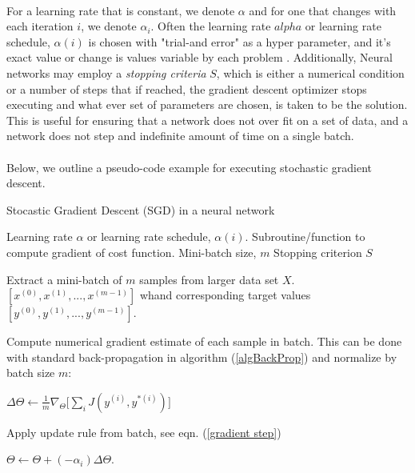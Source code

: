 \documentclass[12pt,letterpaper]{article}
\begin{document}
\paragraph*{}For a learning rate that is constant, we denote $\alpha$ and for one that changes with each iteration $i$, we denote $\alpha_i$. Often the learning rate $alpha$ or learning rate schedule, $\alpha(i)$ is chosen with "trial-and error" as a hyper parameter, and it's exact value or change is values variable by each problem \cite{Goodfellow}. Additionally, Neural networks may employ a \textit{stopping criteria} $S$, which is either a numerical condition or a number of steps that if reached, the gradient descent optimizer stops executing and what ever set of parameters are chosen, is taken to be the solution. This is useful for ensuring that a network does not over fit on a set of data, and a network does not step and indefinite amount of time on a single batch.

\paragraph*{}Below, we outline a pseudo-code example for executing stochastic gradient descent.

\begin{algorithm}
\caption{Stocastic Gradient Descent (SGD) in a neural network}
\label{algSGD}

\begin{algorithmic}

\REQUIRE Learning rate $\alpha$ or learning rate schedule, $\alpha(i)$.
\REQUIRE Subroutine/function to compute gradient of cost function.
\REQUIRE Mini-batch size, $m$
\REQUIRE Stopping criterion $S$

	\item Extract a mini-batch of $m$ samples from larger data set $X$. $[x^{(0)},x^{(1)},...,x^{(m-1)}]$ whand corresponding target values 
	$[y^{(0)},y^{(1)},...,y^{(m-1)}]$.
	\item Compute numerical gradient estimate of each sample in batch. This can be done with standard back-propagation in algorithm (\ref{algBackProp}) and 			 	normalize by batch size $m$:
	\item $\Delta\Theta \leftarrow \frac{1}{m}\nabla_{\Theta} \big[ \sum_i J(y^{(i)},y^{*(i)}) \big] $
	\item Apply update rule from batch, see eqn. (\ref{gradient step})
	\item $\Theta \leftarrow \Theta + (-\alpha_i) \Delta\Theta$.
	
\ENDWHILE


\end{algorithmic}
\end{algorithm}
\end{document}
